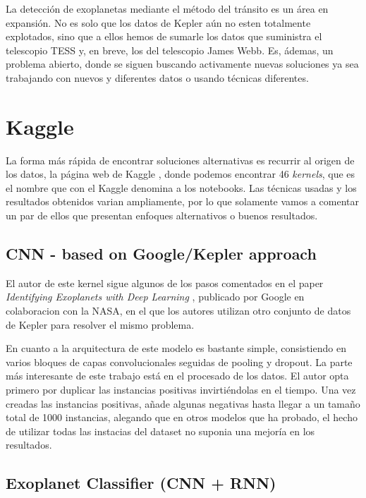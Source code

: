 
La detección de exoplanetas mediante el método del tránsito es un área en expansión. No es solo que los datos de Kepler aún no esten totalmente explotados, sino que a ellos hemos de sumarle los datos que suministra el telescopio TESS y, en breve, los del telescopio James Webb. Es, ádemas, un problema abierto, donde se siguen buscando activamente nuevas soluciones ya sea trabajando con nuevos y diferentes datos o usando técnicas diferentes.

\section{Kaggle}

La forma más rápida de encontrar soluciones alternativas es recurrir al origen de los datos, la página web de Kaggle \cite{Kaggle-exoplanet}, donde podemos encontrar 46 \textit{kernels}, que es el nombre que con el Kaggle denomina a los notebooks. Las técnicas usadas y los resultados obtenidos varian ampliamente, por lo que solamente vamos a comentar un par de ellos que presentan enfoques alternativos o buenos resultados.

\subsection{CNN - based on Google/Kepler approach \cite{Kaggle-kernel-CNN-Google}} 

El autor de este kernel sigue algunos de los pasos comentados en el paper \textit{Identifying Exoplanets with Deep Learning} \cite{2018AJ....155...94S}, publicado por Google en colaboracion con la NASA, en el que los autores utilizan otro conjunto de datos de Kepler para resolver el mismo problema.

En cuanto a la arquitectura de este modelo es bastante simple, consistiendo en varios bloques de capas convolucionales seguidas de pooling y dropout. La parte más interesante de este trabajo está en el procesado de los datos. El autor opta primero por duplicar las instancias positivas invirtiéndolas en el tiempo. Una vez creadas las instancias positivas, añade algunas negativas hasta llegar a un tamaño total de 1000 instancias, alegando que en otros modelos que ha probado, el hecho de utilizar todas las instacias del dataset no suponia una mejoría en los resultados.   

\subsection{Exoplanet Classifier (CNN + RNN) \cite{Kaggle-kernel-Exoplanet-Classifier}}

